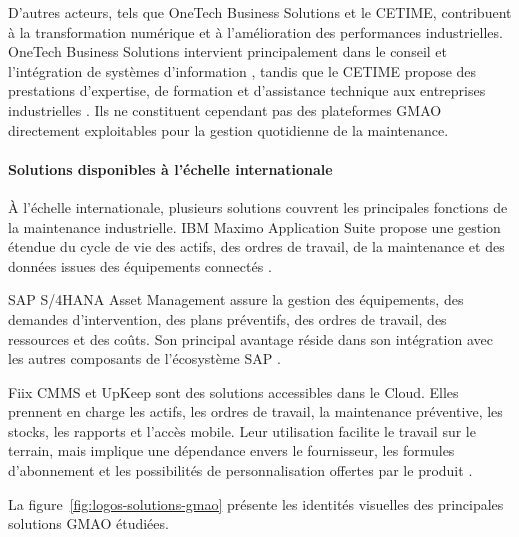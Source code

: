 D’autres acteurs, tels que OneTech Business Solutions et le CETIME, contribuent à la transformation numérique et à l’amélioration des performances industrielles. OneTech Business Solutions intervient principalement dans le conseil et l’intégration de systèmes d’information \cite{onetech_bs}, tandis que le CETIME propose des prestations d’expertise, de formation et d’assistance technique aux entreprises industrielles \cite{cetime_presentation}. Ils ne constituent cependant pas des plateformes GMAO directement exploitables pour la gestion quotidienne de la maintenance.

\paragraph{Solutions disponibles à l’échelle internationale}

À l’échelle internationale, plusieurs solutions couvrent les principales fonctions de la maintenance industrielle. IBM Maximo Application Suite propose une gestion étendue du cycle de vie des actifs, des ordres de travail, de la maintenance et des données issues des équipements connectés \cite{ibm_maximo}.

SAP S/4HANA Asset Management assure la gestion des équipements, des demandes d’intervention, des plans préventifs, des ordres de travail, des ressources et des coûts. Son principal avantage réside dans son intégration avec les autres composants de l’écosystème SAP \cite{sap_asset_management}.

Fiix CMMS et UpKeep sont des solutions accessibles dans le Cloud. Elles prennent en charge les actifs, les ordres de travail, la maintenance préventive, les stocks, les rapports et l’accès mobile. Leur utilisation facilite le travail sur le terrain, mais implique une dépendance envers le fournisseur, les formules d’abonnement et les possibilités de personnalisation offertes par le produit \cite{fiix_cmms,fiix_pricing,upkeep_cmms}.

La figure~\ref{fig:logos-solutions-gmao} présente les identités visuelles des principales solutions GMAO étudiées.

